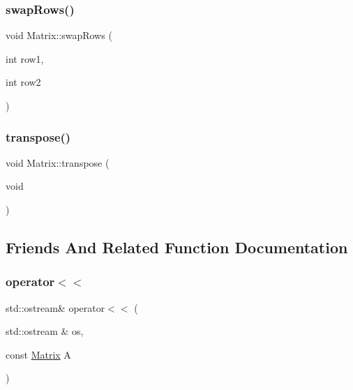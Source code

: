 \mbox{\label{class_matrix_a3d028bc7d149b4f87c847cf0ff50aa18}} 
\subsubsection{\texorpdfstring{swap\+Rows()}{swapRows()}}
{\footnotesize\ttfamily void Matrix\+::swap\+Rows (\begin{DoxyParamCaption}\item[{int}]{row1,  }\item[{int}]{row2 }\end{DoxyParamCaption})}

\mbox{\label{class_matrix_ac9afd875262d35e1bab18604e3bc121c}} 
\subsubsection{\texorpdfstring{transpose()}{transpose()}}
{\footnotesize\ttfamily void Matrix\+::transpose (\begin{DoxyParamCaption}\item[{void}]{ }\end{DoxyParamCaption})}



\subsection{Friends And Related Function Documentation}
\mbox{\label{class_matrix_ac7214274c9ef83ebef022af7225ac068}} 
\subsubsection{\texorpdfstring{operator$<$$<$}{operator<<}}
{\footnotesize\ttfamily std\+::ostream\& operator$<$$<$ (\begin{DoxyParamCaption}\item[{std\+::ostream \&}]{os,  }\item[{const \mbox{\hyperlink{class_matrix}{Matrix}}}]{A }\end{DoxyParamCaption})\hspace{0.3cm}{\ttfamily [friend]}}



